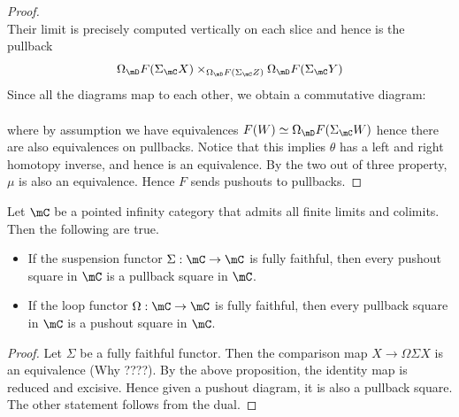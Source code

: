 \documentclass[a4paper]{article}
\begin{document}
\begin{prp}{}{}
\begin{proof}
{}\\
Their limit is precisely computed vertically on each slice and hence is the pullback $$\Omega_\mD F(\Sigma_\mC X)\times_{\Omega_\mD F(\Sigma_\mC Z)}\Omega_\mD F(\Sigma_\mC Y)$$ Since all the diagrams map to each other, we obtain a commutative diagram: \\
\\
where by assumption we have equivalences $F(W)\simeq\Omega_\mD F(\Sigma_\mC W)$ hence there are also equivalences on pullbacks. Notice that this implies $\theta$ has a left and right homotopy inverse, and hence is an equivalence. By the two out of three property, $\mu$ is also an equivalence. Hence $F$ sends pushouts to pullbacks. 
\end{proof}
\end{prp}

\begin{prp}{}{} Let $\mC$ be a pointed infinity category that admits all finite limits and colimits. Then the following are true. 
\begin{itemize}
\item If the suspension functor $\Sigma:\mC\to\mC$ is fully faithful, then every pushout square in $\mC$ is a pullback square in $\mC$. 
\item If the loop functor $\Omega:\mC\to\mC$ is fully faithful, then every pullback square in $\mC$ is a pushout square in $\mC$. 
\end{itemize} 
\begin{proof}
Let $\Sigma$ be a fully faithful functor. Then the comparison map $X\to\Omega\Sigma X$ is an equivalence (Why ????). By the above proposition, the identity map is reduced and excisive. Hence given a pushout diagram, it is also a pullback square. The other statement follows from the dual. 
\end{proof}
\end{prp}
\end{document}
